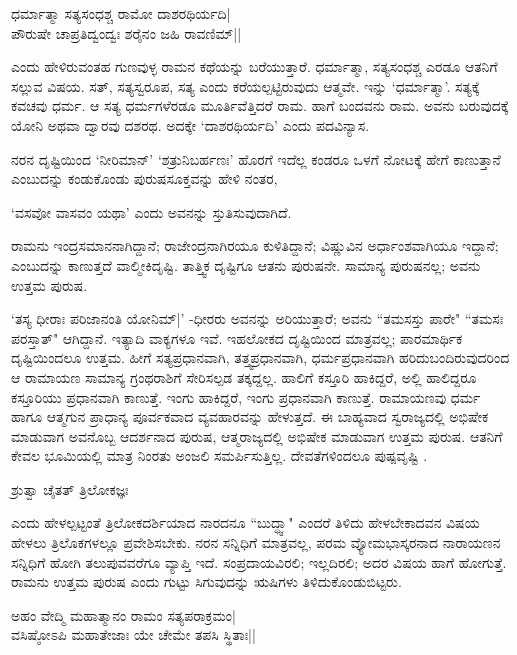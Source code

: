 \begin{shloka}
ಧರ್ಮಾತ್ಮಾ ಸತ್ಯಸಂಧಶ್ಚ ರಾಮೋ ದಾಶರಥಿರ್ಯದಿ|\\
ಪೌರುಷೇ ಚಾಪ್ರತಿದ್ವಂದ್ವಃ ಶರೈನಂ ಜಹಿ ರಾವಣಿಮ್||
\end{shloka}

ಎಂದು ಹೇಳಿರುವಂತಹ ಗುಣವುಳ್ಳ ರಾಮನ ಕಥೆಯನ್ನು ಬರೆಯುತ್ತಾರೆ. ಧರ್ಮಾತ್ಮಾ, ಸತ್ಯಸಂಧಶ್ಚ ಎರಡೂ ಆತನಿಗೆ ಸಲ್ಲುವ ವಿಷಯ. ಸತ್, ಸತ್ಯಸ್ವರೂಪ, ಸತ್ಯ ಎಂದು ಕರೆಯಲ್ಪಟ್ಟಿರುವುದು ಆತ್ಮವೇ. ಇನ್ನು `ಧರ್ಮಾತ್ಮಾ'. ಸತ್ಯಕ್ಕೆ ಕವಚವು ಧರ್ಮ.  ಆ ಸತ್ಯ ಧರ್ಮಗಳೆರಡೂ ಮೂರ್ತಿವೆತ್ತಿದರೆ ರಾಮ. ಹಾಗೆ ಬಂದವನು ರಾಮ. ಅವನು ಬರುವುದಕ್ಕೆ ಯೋನಿ ಅಥವಾ ದ್ವಾರವು ದಶರಥ. ಅದಕ್ಕೇ `ದಾಶರಥಿರ್ಯದಿ' ಎಂದು ಪದವಿನ್ಯಾಸ. 

ನರನ ದೃಷ್ಟಿಯಿಂದ `ನೀರಿಮಾನ್' `ಶತ್ರುನಿಬರ್ಹಣಃ' ಹೊರಗೆ ಇದೆಲ್ಲ ಕಂಡರೂ ಒಳಗೆ ನೋಟಕ್ಕೆ ಹೇಗೆ ಕಾಣುತ್ತಾನೆ ಎಂಬುದನ್ನು ಕಂಡುಕೊಂಡು ಪುರುಷಸೂಕ್ತವನ್ನು ಹೇಳಿ ನಂತರ, 

\begin{shloka}
`ವಸವೋ ವಾಸವಂ ಯಥಾ' ಎಂದು ಅವನನ್ನು ಸ್ತುತಿಸುವುದಾಗಿದೆ.
\end{shloka}

ರಾಮನು ಇಂದ್ರಸಮಾನನಾಗಿದ್ದಾನೆ; ರಾಜೇಂದ್ರನಾಗಿರಯೂ ಕುಳಿತಿದ್ದಾನೆ; ವಿಷ್ಣುವಿನ ಅರ್ಧಾಂಶವಾಗಿಯೂ ಇದ್ದಾನೆ; ಎಂಬುದನ್ನು ಕಾಣುತ್ತದೆ ವಾಲ್ಮೀಕಿದೃಷ್ಟಿ. ತಾತ್ತ್ವಿಕ ದೃಷ್ಟಿಗೂ ಆತನು ಪುರುಷನೇ. ಸಾಮಾನ್ಯ ಪುರುಷನಲ್ಲ; ಅವನು ಉತ್ತಮ ಪುರುಷ. 

`ತಸ್ಯ ಧೀರಾಃ ಪರಿಜಾನಂತಿ ಯೋನಿಮ್|' -ಧೀರರು ಅವನನ್ನು ಅರಿಯುತ್ತಾರೆ; ಅವನು ``ತಮಸಸ್ತು ಪಾರೇ" ``ತಮಸಃ ಪರಸ್ತಾತ್" ಆಗಿದ್ದಾನೆ. ಇತ್ಯಾದಿ ವಾಕ್ಯಗಳೂ ಇವೆ. ಇಹಲೋಕದ ದೃಷ್ಟಿಯಿಂದ ಮಾತ್ರವಲ್ಲ; ಪಾರಮಾರ್ಥಿಕ ದೃಷ್ಟಿಯಿಂದಲೂ ಉತ್ತಮ. ಹೀಗೆ ಸತ್ಯಪ್ರಧಾನವಾಗಿ, ತತ್ತ್ವಪ್ರಧಾನವಾಗಿ, ಧರ್ಮಪ್ರಧಾನವಾಗಿ ಹರಿದುಬಂದಿರುವುದರಿಂದ ಆ ರಾಮಾಯಣ ಸಾಮಾನ್ಯ ಗ್ರಂಥರಾಶಿಗೆ ಸೇರಿಸಲ್ಪಡ ತಕ್ಕದ್ದಲ್ಲ. ಹಾಲಿಗೆ ಕಸ್ತೂರಿ ಹಾಕಿದ್ದರೆ, ಅಲ್ಲಿ ಹಾಲಿದ್ದರೂ ಕಸ್ತೂರಿಯು ಪ್ರಧಾನವಾಗಿ ಕಾಣುತ್ತೆ. ಇಂಗು ಹಾಕಿದ್ದರೆ, ಇಂಗು ಪ್ರಧಾನವಾಗಿ ಕಾಣುತ್ತೆ. ರಾಮಾಯಣವು ಧರ್ಮ ಹಾಗೂ ಆತ್ಮಗುನ ಪ್ರಾಧಾನ್ಯ ಪೂರ್ವಕವಾದ ವ್ಯವಹಾರವನ್ನು ಹೇಳುತ್ತದೆ. ಈ ಬಾಹ್ಯವಾದ ಸ್ವರಾಜ್ಯದಲ್ಲಿ ಅಭಿಷೇಕ ಮಾಡುವಾಗ ಅವನೊಬ್ಬ ಆದರ್ಶನಾದ ಪುರುಷ, ಆತ್ಮರಾಜ್ಯದಲ್ಲಿ ಅಭಿಷೇಕ ಮಾಡುವಾಗ ಉತ್ತಮ ಪುರುಷ. ಆತನಿಗೆ ಕೇವಲ ಭೂಮಿಯಲ್ಲಿ ಮಾತ್ರ ನಿಂರತು ಅಂಜಲಿ ಸಮರ್ಪಿಸುತ್ತಿಲ್ಲ. ದೇವತೆಗಳಿಂದಲೂ ಪುಷ್ಪವೃಷ್ಟಿ .

\begin{shloka}
ಶ್ರುತ್ವಾ ಚೈತತ್ ತ್ರಿಲೋಕಜ್ಞಃ
\end{shloka}
ಎಂದು ಹೇಳಲ್ಪಟ್ಟಂತೆ ತ್ರಿಲೋಕದರ್ಶಿಯಾದ ನಾರದನೂ ``ಬುದ್ಧ್ವಾ" ಎಂದರೆ ತಿಳಿದು ಹೇಳಬೇಕಾದವನ ವಿಷಯ ಹೇಳಲು ತ್ರಿಲೊಕಗಳಲ್ಲೂ ಪ್ರವೇಶಿಸಬೇಕು. ನರನ ಸನ್ನಿಧಿಗೆ ಮಾತ್ರವಲ್ಲ, ಪರಮ ವ್ಯೋಮಭಾಸ್ಕರನಾದ ನಾರಾಯಣನ ಸನ್ನಿಧಿಗೆ ಹೋಗಿ ತಲುಪುವವರೆಗೂ ವ್ಯಾಪ್ತಿ ಇದೆ. ಸಂಪ್ರದಾಯವಿರಲಿ; ಇಲ್ಲದಿರಲಿ; ಅದರ ವಿಷಯ ಹಾಗೆ ಹೋಗುತ್ತೆ. ರಾಮನು ಉತ್ತಮ ಪುರುಷ ಎಂದು ಗುಟ್ಟು ಸಿಗುವುದನ್ನು ಋಷಿಗಳು ತಿಳಿದುಕೊಂಡುಬಿಟ್ಟರು.

\begin{shloka}
ಅಹಂ ವೇದ್ಮಿ ಮಹಾತ್ಮಾನಂ ರಾಮಂ ಸತ್ಯಪರಾಕ್ರಮಂ|\\
ವಸಿಷ್ಠೋಽಪಿ ಮಹಾತೇಜಾಃ ಯೇ ಚೇಮೇ ತಪಸಿ ಸ್ಥಿತಾಃ||
\end{shloka}

